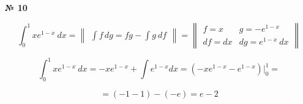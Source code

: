 \documentclass{article}
\begin{document}
\textbf{№ 10} 
\large

$$ \int_{0}^{1} xe^{1-x} \ dx 
= \begin{Vmatrix} \int f \,dg = fg - \int g \ df \end{Vmatrix} =
   \begin{Vmatrix} f = x &  g = -e^{1-x} \\
                  df = dx  & dg = e^{1-x} \ dx \end{Vmatrix} $$

$$ \int_{0}^{1} xe^{1-x} \ dx
= -xe^{1-x} + \int e^{1-x} dx 
= \left( -xe^{1-x} - e^{1-x} \right) \bigg\vert_{0}^{1}
= $$

$$ = \left( -1 -1 \right) - \left( -e \right)
= e - 2 $$
\end{document}
